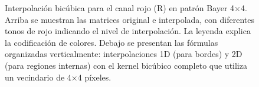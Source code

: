 \begin{figure}[h]
\caption{Interpolación bicúbica para el canal rojo (R) en patrón Bayer 4×4. Arriba se muestran las matrices original e interpolada, con diferentes tonos de rojo indicando el nivel de interpolación. La leyenda explica la codificación de colores. Debajo se presentan las fórmulas organizadas verticalmente: interpolaciones 1D (para bordes) y 2D (para regiones internas) con el kernel bicúbico completo que utiliza un vecindario de 4×4 píxeles.}
\label{fig:interpolacion_bicubica_R_completa_final5}
\end{figure}
